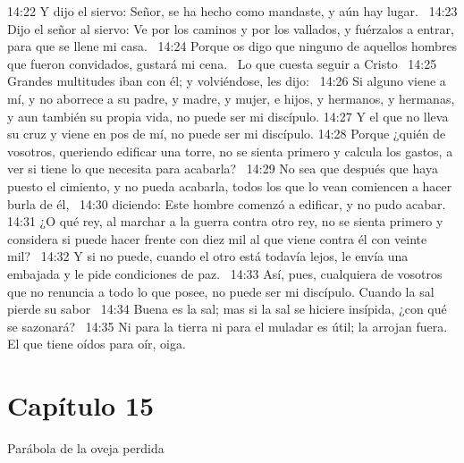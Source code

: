 14:22 Y dijo el siervo: Señor, se ha hecho como mandaste, y aún hay lugar.  
14:23 Dijo el señor al siervo: Ve por los caminos y por los vallados, y fuérzalos a entrar, para que se llene mi casa.  
14:24 Porque os digo que ninguno de aquellos hombres que fueron convidados, gustará mi cena.  
Lo que cuesta seguir a Cristo  
14:25 Grandes multitudes iban con él; y volviéndose, les dijo:  
14:26 Si alguno viene a mí, y no aborrece a su padre, y madre, y mujer, e hijos, y hermanos, y hermanas, y aun también su propia vida, no puede ser mi discípulo. 
14:27 Y el que no lleva su cruz y viene en pos de mí, no puede ser mi discípulo. 
14:28 Porque ¿quién de vosotros, queriendo edificar una torre, no se sienta primero y calcula los gastos, a ver si tiene lo que necesita para acabarla?  
14:29 No sea que después que haya puesto el cimiento, y no pueda acabarla, todos los que lo vean comiencen a hacer burla de él,  
14:30 diciendo: Este hombre comenzó a edificar, y no pudo acabar.  
14:31 ¿O qué rey, al marchar a la guerra contra otro rey, no se sienta primero y considera si puede hacer frente con diez mil al que viene contra él con veinte mil?  
14:32 Y si no puede, cuando el otro está todavía lejos, le envía una embajada y le pide condiciones de paz.  
14:33 Así, pues, cualquiera de vosotros que no renuncia a todo lo que posee, no puede ser mi discípulo. 
Cuando la sal pierde su sabor   
14:34 Buena es la sal; mas si la sal se hiciere insípida, ¿con qué se sazonará?  
14:35 Ni para la tierra ni para el muladar es útil; la arrojan fuera. El que tiene oídos para oír, oiga.  
\section*{Capítulo 15}
Parábola de la oveja perdida   

